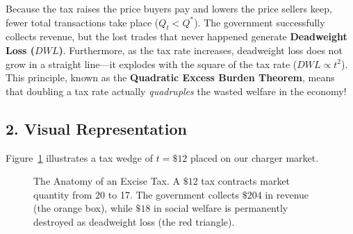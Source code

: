 \documentclass[11pt,letterpaper]{article}
\begin{document}
Because the tax raises the price buyers pay and lowers the price sellers keep, fewer total transactions take place ($Q_t < Q^*$). The government successfully collects revenue, but the lost trades that never happened generate \textbf{Deadweight Loss ($DWL$)}. Furthermore, as the tax rate increases, deadweight loss does not grow in a straight line—it explodes with the square of the tax rate ($DWL \propto t^2$). This principle, known as the \textbf{Quadratic Excess Burden Theorem}, means that doubling a tax rate actually \emph{quadruples} the wasted welfare in the economy!

\subsection*{2. Visual Representation}
Figure~\ref{fig:tax_wedge} illustrates a tax wedge of $t = \$12$ placed on our charger market. 

\begin{figure}[htbp]
\centering
{}
\caption{The Anatomy of an Excise Tax. A $\$12$ tax contracts market quantity from 20 to 17. The government collects $\$204$ in revenue (the orange box), while $\$18$ in social welfare is permanently destroyed as deadweight loss (the red triangle).}
\label{fig:tax_wedge}
\end{figure}
\end{document}

